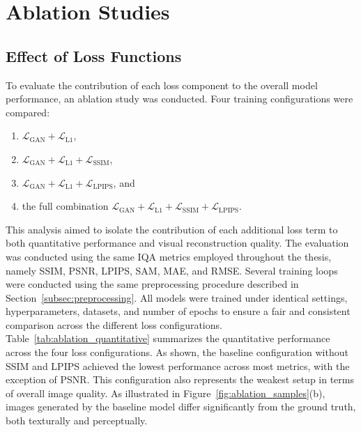 \section{Ablation Studies}
\label{chapter:ablation}
\subsection{Effect of Loss Functions}
\label{subsec:ablation_loss}
To evaluate the contribution of each loss component to the overall model performance, an ablation study was conducted. Four training configurations were compared:
\begin{enumerate}
    \item $\mathcal{L}_{\text{GAN}} + \mathcal{L}_{\text{L1}}$,
    \item $\mathcal{L}_{\text{GAN}} + \mathcal{L}_{\text{L1}} + \mathcal{L}_{\text{SSIM}}$,
    \item $\mathcal{L}_{\text{GAN}} + \mathcal{L}_{\text{L1}} + \mathcal{L}_{\text{LPIPS}}$, and
    \item the full combination $\mathcal{L}_{\text{GAN}} + \mathcal{L}_{\text{L1}} + \mathcal{L}_{\text{SSIM}} + \mathcal{L}_{\text{LPIPS}}$.
\end{enumerate}
This analysis aimed to isolate the contribution of each additional loss term to both quantitative performance and visual reconstruction quality. The evaluation was conducted using the same IQA metrics employed throughout the thesis, namely SSIM, PSNR, LPIPS, SAM, MAE, and RMSE. Several training loops were conducted using the same preprocessing procedure described in Section~\ref{subsec:preprocessing}. All models were trained under identical settings, hyperparameters, datasets, and number of epochs to ensure a fair and consistent comparison across the different loss configurations.
Table~\ref{tab:ablation_quantitative} summarizes the quantitative performance across the four loss configurations. As shown, the baseline configuration without SSIM and LPIPS achieved the lowest performance across most metrics, with the exception of PSNR. This configuration also represents the weakest setup in terms of overall image quality. As illustrated in Figure~\ref{fig:ablation_samples}(b), images generated by the baseline model differ significantly from the ground truth, both texturally and perceptually. 

